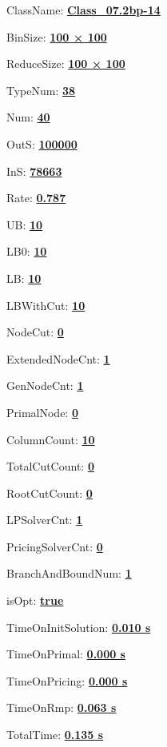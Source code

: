 \documentclass[11pt]{article}
\begin{document}
\pagestyle{empty}


ClassName: \underline{\textbf{Class_07.2bp-14}}
\par
BinSize: \underline{\textbf{100 × 100}}
\par
ReduceSize: \underline{\textbf{100 × 100}}
\par
TypeNum: \underline{\textbf{38}}
\par
Num: \underline{\textbf{40}}
\par
OutS: \underline{\textbf{100000}}
\par
InS: \underline{\textbf{78663}}
\par
Rate: \underline{\textbf{0.787}}
\par
UB: \underline{\textbf{10}}
\par
LB0: \underline{\textbf{10}}
\par
LB: \underline{\textbf{10}}
\par
LBWithCut: \underline{\textbf{10}}
\par
NodeCut: \underline{\textbf{0}}
\par
ExtendedNodeCnt: \underline{\textbf{1}}
\par
GenNodeCnt: \underline{\textbf{1}}
\par
PrimalNode: \underline{\textbf{0}}
\par
ColumnCount: \underline{\textbf{10}}
\par
TotalCutCount: \underline{\textbf{0}}
\par
RootCutCount: \underline{\textbf{0}}
\par
LPSolverCnt: \underline{\textbf{1}}
\par
PricingSolverCnt: \underline{\textbf{0}}
\par
BranchAndBoundNum: \underline{\textbf{1}}
\par
isOpt: \underline{\textbf{true}}
\par
TimeOnInitSolution: \underline{\textbf{0.010 s}}
\par
TimeOnPrimal: \underline{\textbf{0.000 s}}
\par
TimeOnPricing: \underline{\textbf{0.000 s}}
\par
TimeOnRmp: \underline{\textbf{0.063 s}}
\par
TotalTime: \underline{\textbf{0.135 s}}
\par
\newpage


\end{document}
